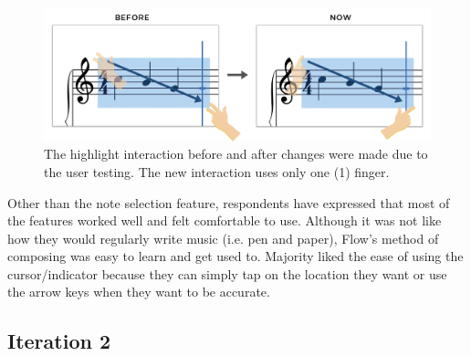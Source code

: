 			\begin{figure}[h]
				\centering
				\includegraphics[scale=0.25]{figures/before-after-highlight}
			    \caption{The highlight interaction before and after changes were made due to the user testing. The new interaction uses only one (1) finger.}
			    \label{fig:highlight}
			\end{figure}

			Other than the note selection feature, respondents have expressed that most of the features worked well and felt comfortable to use. Although it was not like how they would regularly write music (i.e. pen and paper), Flow's method of composing was easy to learn and get used to. Majority liked the ease of using the cursor/indicator because they can simply tap on the location they want or use the arrow keys when they want to be accurate.

		\subsection{Iteration 2}

